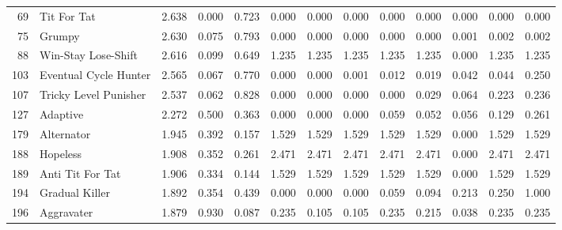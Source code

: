 \begin{tabular}{rlrrrrrrrrrrr}
   69 &            Tit For Tat &           2.638 &       0.000 &    0.723 &             0.000 &         0.000 &           0.000 &            0.000 &          0.000 &         0.000 &            0.000 &         0.000 \\
   75 &                 Grumpy &           2.630 &       0.075 &    0.793 &             0.000 &         0.000 &           0.000 &            0.000 &          0.000 &         0.001 &            0.002 &         0.002 \\
   88 &    Win-Stay Lose-Shift &           2.616 &       0.099 &    0.649 &             1.235 &         1.235 &           1.235 &            1.235 &          1.235 &         0.000 &            1.235 &         1.235 \\
  103 &  Eventual Cycle Hunter &           2.565 &       0.067 &    0.770 &             0.000 &         0.000 &           0.001 &            0.012 &          0.019 &         0.042 &            0.044 &         0.250 \\
  107 &  Tricky Level Punisher &           2.537 &       0.062 &    0.828 &             0.000 &         0.000 &           0.000 &            0.000 &          0.029 &         0.064 &            0.223 &         0.236 \\
  127 &               Adaptive &           2.272 &       0.500 &    0.363 &             0.000 &         0.000 &           0.000 &            0.059 &          0.052 &         0.056 &            0.129 &         0.261 \\
  179 &             Alternator &           1.945 &       0.392 &    0.157 &             1.529 &         1.529 &           1.529 &            1.529 &          1.529 &         0.000 &            1.529 &         1.529 \\
  188 &               Hopeless &           1.908 &       0.352 &    0.261 &             2.471 &         2.471 &           2.471 &            2.471 &          2.471 &         0.000 &            2.471 &         2.471 \\
  189 &       Anti Tit For Tat &           1.906 &       0.334 &    0.144 &             1.529 &         1.529 &           1.529 &            1.529 &          1.529 &         0.000 &            1.529 &         1.529 \\
  194 &         Gradual Killer &           1.892 &       0.354 &    0.439 &             0.000 &         0.000 &           0.000 &            0.059 &          0.094 &         0.213 &            0.250 &         1.000 \\
  196 &             Aggravater &           1.879 &       0.930 &    0.087 &             0.235 &         0.105 &           0.105 &            0.235 &          0.215 &         0.038 &            0.235 &         0.235 \\

\end{tabular}
